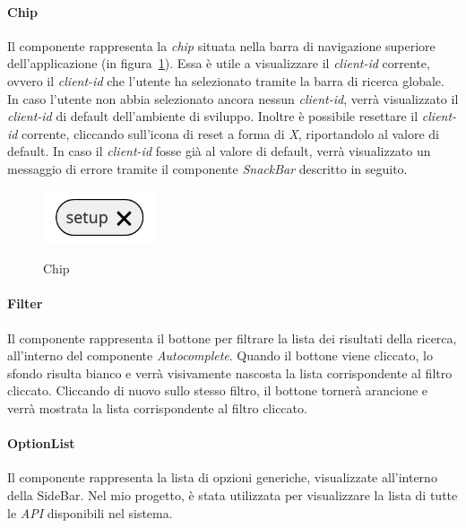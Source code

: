\paragraph{Chip}\label{par:chip}
Il componente rappresenta la \textit{chip} situata nella barra di navigazione superiore dell'applicazione (in figura~\ref{fig:chip}).
Essa è utile a visualizzare il \textit{client-id} corrente, ovvero il \textit{client-id} che l'utente ha selezionato tramite la barra di ricerca globale.
In caso l'utente non abbia selezionato ancora nessun \textit{client-id}, verrà visualizzato il \textit{client-id} di default dell'ambiente di sviluppo.
Inoltre è possibile resettare il \textit{client-id} corrente, cliccando sull'icona di reset a forma di \textit{X}, riportandolo al valore di default.
In caso il \textit{client-id} fosse già al valore di default, verrà visualizzato un messaggio di errore tramite il componente \textit{SnackBar} descritto in seguito.

\begin{figure}[ht]
  \centering
  \includegraphics[width=0.3\textwidth, alt={Chip contenente il client id corrente}]{images/frontend/Chip.jpg}
  \caption{Chip}\label{fig:chip}
\end{figure}


\paragraph{Filter}\label{par:filter}
Il componente rappresenta il bottone per filtrare la lista dei risultati della ricerca, all'interno del componente \textit{Autocomplete}.
Quando il bottone viene cliccato, lo sfondo risulta bianco e verrà visivamente nascosta la lista corrispondente al filtro cliccato.
Cliccando di nuovo sullo stesso filtro, il bottone tornerà arancione e verrà  mostrata la lista corrispondente al filtro cliccato.


\paragraph{OptionList}\label{par:option-list}
Il componente rappresenta la lista di opzioni generiche, visualizzate all'interno della SideBar. Nel mio progetto, è stata utilizzata per visualizzare la lista
di tutte le \textit{API} disponibili nel sistema. 

